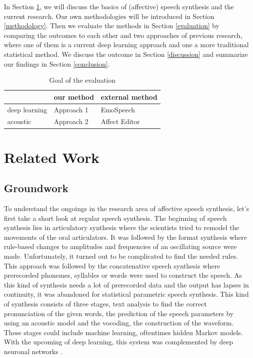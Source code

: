 \documentclass[11pt]{article}
\begin{document}
In Section \ref{related_work}, we will discuss the basics of (affective) speech synthesis and the current research. Our own methodologies will be introduced in Section \ref{methodology}. Then we evaluate the methods in  Section \ref{evaluation} by comparing the outcomes to each other and two approaches of previous research, where one of them is a current deep learning approach and one a more traditional statistical method. We discuss the outcome in Section \ref{discussion} and summarize our findings in Section \ref{conclusion}.

\begin{table}[h]

\vspace{5px}
{
\begin{tabular}{|l|l|l|}
\hline
\rowcolor{gainsboro}&our method&external method\\
\hline
\cellcolor{gainsboro}deep learning&Approach 1&EmoSpeech\\
\hline
\cellcolor{gainsboro}acoustic&Approach 2&Affect Editor\\
\hline

\end{tabular}

}
\caption{Goal of the evaluation}
\end{table}


\section{Related Work}
\label{related_work}
\subsection{Groundwork}
To understand the ongoings in the research area of affective speech synthesis, let’s first take a short look at regular speech synthesis. The beginning of speech synthesis lies in articulatory synthesis where the scientists tried to remodel the movements of the oral articulators. It was followed by the format synthesis where rule-based changes to amplitudes and frequencies of an oscillating source were made. Unfortunately, it turned out to be complicated to find the needed rules. This approach was followed by the concatenative speech synthesis where prerecorded phonemes, syllables or words were used to construct the speech. As this kind of synthesis needs a lot of prerecorded data and the output has lapses in continuity, it was abandoned for statistical parametric speech synthesis. This kind of synthesis consists of three stages, text analysis to find the correct pronunciation of the given words, the prediction of the speech parameters by using an acoustic model and the vocoding, the construction of the waveform. These stages could include machine learning, oftentimes hidden Markov models. With the upcoming of deep learning, this system was complemented by deep neuronal networks \cite{triantafyllopoulos_overview_2023,shen_natural_2018}.
\end{document}
